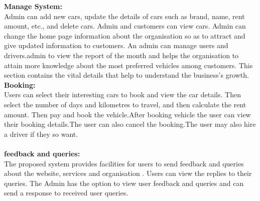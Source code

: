 \documentclass[a4paper,12pt,toc=flat]{report}
\begin{document}
{	            
	            	{\bf \hspace{-20pt} Manage System:}
				\\
	            Admin can add new cars, update the details of cars such as brand, name, rent amount, etc., and delete cars. Admin and customers can view cars. Admin can change the home page information about the organisation so as to attract and give updated information to customers. An admin can manage users and drivers.admin to view the report of the month and helps the organisation to attain more knowledge about the most preferred vehicles among customers. This section contains the vital details that help to understand the business's growth.
	             \\
	           
	             
	              	{\bf \hspace{-20pt}Booking:}
				\\
	           Users can select their interesting cars to book and view the car details. Then select the number of days and kilometres to travel, and then calculate the rent amount. Then pay and book the vehicle.After booking vehicle the user can view their booking details.The user can also cancel the booking.The user may also hire a driver if they so want.
	             \\
	           
	            	
	             \\
	            
	            {\bf \hspace{-20pt}feedback and queries:}
				\\
	           The proposed system provides facilities for users to send feedback and queries about the website, services and organisation . Users can view the replies to their queries. The Admin has the option to view user feedback and queries and can send a response to received user queries.
	           \\

	             
	            
	           
	           
	          
	            
		
	          
}
\end{document}
